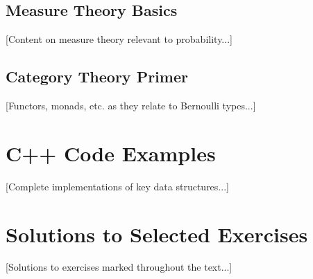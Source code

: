 \documentclass[11pt,twoside,openright]{book}
\theoremstyle{definition}
\theoremstyle{plain}
\theoremstyle{remark}
\begin{document}
\section{Measure Theory Basics}

[Content on measure theory relevant to probability...]

\section{Category Theory Primer}

[Functors, monads, etc. as they relate to Bernoulli types...]

\chapter{C++ Code Examples}

[Complete implementations of key data structures...]

\chapter{Solutions to Selected Exercises}

[Solutions to exercises marked throughout the text...]

\backmatter




\printindex
\end{document}
